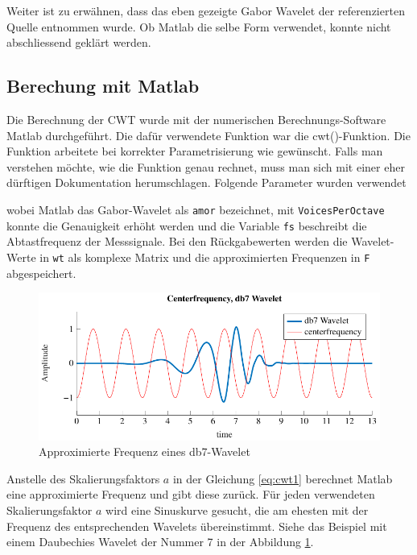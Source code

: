 \begin{refsection}
Weiter ist zu erwähnen, dass das eben gezeigte Gabor Wavelet der referenzierten Quelle entnommen wurde. Ob Matlab die selbe Form verwendet, konnte nicht abschliessend geklärt werden.

\subsection{Berechung mit Matlab}
\label{matlab}
Die Berechnung der CWT wurde mit der numerischen Berechnungs-Software Matlab durchgeführt.
%
Die dafür verwendete Funktion war die cwt()-Funktion.
Die Funktion arbeitete bei korrekter Parametrisierung wie gewünscht.
Falls man verstehen möchte, wie die Funktion genau rechnet, muss man sich mit einer eher dürftigen Dokumentation herumschlagen.
Folgende Parameter wurden verwendet
%

\label{fig:matlab_code_cwt}
wobei Matlab das Gabor-Wavelet als \texttt{amor} bezeichnet, mit \texttt{VoicesPerOctave} konnte die Genauigkeit erhöht werden und die Variable \texttt{fs} beschreibt die Abtastfrequenz der Messsignale.
Bei den Rückgabewerten werden die Wavelet-Werte in \texttt{wt} als komplexe Matrix und die approximierten Frequenzen in \texttt{F} abgespeichert.
%

\begin{figure}
	\centering
	\includegraphics[width=1\textwidth]{papers/wwt/images/centerf.pdf}
	\caption{Approximierte Frequenz eines db7-Wavelet}
	\label{fig:centerf}
\end{figure}


Anstelle des Skalierungsfaktors $a$ in der Gleichung \eqref{eq:cwt1} berechnet Matlab eine approximierte Frequenz und gibt diese zurück.
Für jeden verwendeten Skalierungsfaktor $a$ wird eine Sinuskurve gesucht, die am ehesten mit der Frequenz des entsprechenden Wavelets übereinstimmt.
Siehe das Beispiel mit einem Daubechies Wavelet der Nummer 7 in der Abbildung \ref{fig:centerf}.



\end{refsection}
